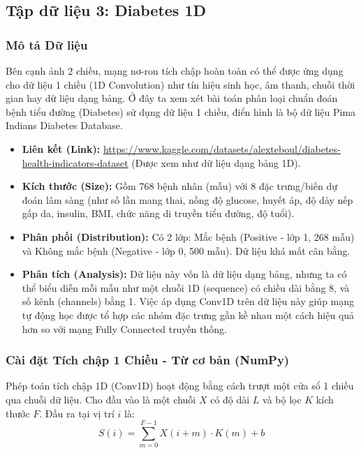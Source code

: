 \documentclass[12pt,a4paper]{article}
\begin{document}
\newpage
\subsection{Tập dữ liệu 3: Diabetes 1D}

\subsubsection{Mô tả Dữ liệu}
Bên cạnh ảnh 2 chiều, mạng nơ-ron tích chập hoàn toàn có thể được ứng dụng cho dữ liệu 1 chiều (1D Convolution) như tín hiệu sinh học, âm thanh, chuỗi thời gian hay dữ liệu dạng bảng. Ở đây ta xem xét bài toán phân loại chuẩn đoán bệnh tiểu đường (Diabetes) sử dụng dữ liệu 1 chiều, điển hình là bộ dữ liệu Pima Indians Diabetes Database.
\begin{itemize}
    \item \textbf{Liên kết (Link):} \url{https://www.kaggle.com/datasets/alexteboul/diabetes-health-indicators-dataset} (Được xem như dữ liệu dạng bảng 1D).
    \item \textbf{Kích thước (Size):} Gồm 768 bệnh nhân (mẫu) với 8 đặc trưng/biến dự đoán lâm sàng (như số lần mang thai, nồng độ glucose, huyết áp, độ dày nếp gấp da, insulin, BMI, chức năng di truyền tiểu đường, độ tuổi).
    \item \textbf{Phân phối (Distribution):} Có 2 lớp: Mắc bệnh (Positive - lớp 1, 268 mẫu) và Không mắc bệnh (Negative - lớp 0, 500 mẫu). Dữ liệu khá mất cân bằng.
    \item \textbf{Phân tích (Analysis):} Dữ liệu này vốn là dữ liệu dạng bảng, nhưng ta có thể biểu diễn mỗi mẫu như một chuỗi 1D (sequence) có chiều dài bằng 8, và số kênh (channels) bằng 1. Việc áp dụng Conv1D trên dữ liệu này giúp mạng tự động học được tổ hợp các nhóm đặc trưng gần kề nhau một cách hiệu quả hơn so với mạng Fully Connected truyền thống.
\end{itemize}

\subsubsection{Cài đặt Tích chập 1 Chiều - Từ cơ bản (NumPy)}

Phép toán tích chập 1D (Conv1D) hoạt động bằng cách trượt một cửa sổ 1 chiều qua chuỗi dữ liệu. Cho đầu vào là một chuỗi $X$ có độ dài $L$ và bộ lọc $K$ kích thước $F$.
Đầu ra tại vị trí $i$ là:
\begin{equation}
    S(i) = \sum_{m=0}^{F-1} X(i + m) \cdot K(m) + b
\end{equation}
\end{document}

